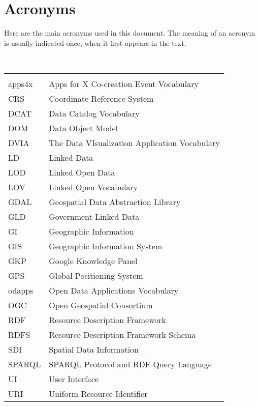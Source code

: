 

\chapter*{Acronyms}

Here are the main acronyms used in this document. The meaning of an acronym is usually indicated once, when it first appears in the text. 

 \\

\begin{longtable}{lp{11cm}}
  &\\
  apps4x	 & Apps for X Co-creation Event Vocabulary\\
  CRS &  Coordinate Reference System\\
  
  DCAT & 	Data Catalog Vocabulary\\
  DOM  & Data Object Model \\
  DVIA & The Data VIsualization Application Vocabulary\\
  
  
  LD  &  Linked Data\\
  LOD &  Linked Open Data\\ 
  
  
  LOV &  Linked Open Vocabulary\\
  
  GDAL & Geospatial Data Abstraction Library \\
  GLD &  Government Linked Data\\
  GI  &  Geographic Information\\
  GIS &  Geographic Information System\\
  GKP &  Google Knowledge Panel \\
  GPS &  Global Positioning System \\
  
  odapps	 & Open Data Applications Vocabulary\\
  OGC &  Open Geospatial Consortium\\
  
  RDF &  Resource Description Framework\\
  RDFS & Resource Description Framework Schema\\
  SDI  & Spatial Data Information\\
  SPARQL	 & SPARQL Protocol and RDF Query Language\\
  UI  & User Interface \\
  URI &	Uniform Resource Identifier\\
  







  
  
 
\end{longtable}

